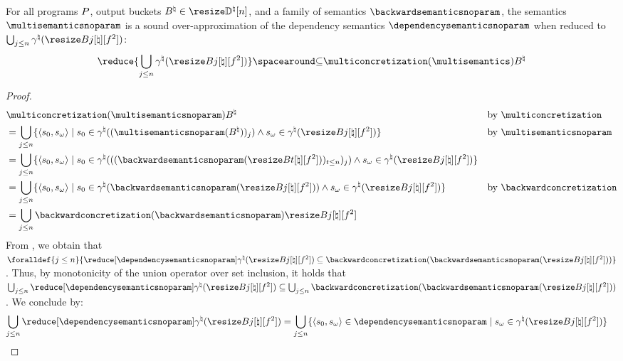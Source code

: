 \begin{lemma}
  For all programs $P$, output buckets $\buckets\in\vectorbuckets$, and a family of semantics $\backwardsemanticsnoparam$, the %
  semantics $\multisemanticsnoparam$ is a \textup{sound over-approximation} of the dependency semantics $\dependencysemanticsnoparam$ when reduced to $\bigsetjoin_{j\le n}\abstractdomainconcretization(\bucket)$:
  \[\reduce{\bigsetjoin_{j\le n}\abstractdomainconcretization(\bucket)} \SubseteQ \multiconcretization(\multisemantics)\buckets\]
\end{lemma}
\begin{proof}
  \begin{align*}
    &\vphantom{=} \multiconcretization(\multisemanticsnoparam)\buckets
      && \text{by $\multiconcretization$} \\
    &= \bigsetjoin_{j \le n}\setdef{\inputoutputtuple{\defstate}}{\retrieveinput{\defstate}\in\abstractdomainconcretization((\multisemanticsnoparam(\buckets))_j)\land\retrieveoutput{\defstate}\in\abstractdomainconcretization(\bucket)}
      && \text{by $\multisemanticsnoparam$} \\
    &= \bigsetjoin_{j \le n} \setdef{\inputoutputtuple{\defstate}}{\retrieveinput{\defstate}\in\abstractdomainconcretization(((\backwardsemanticsnoparam(\bucket[t]))_{t\le n})_j)\land\retrieveoutput{\defstate}\in\abstractdomainconcretization(\bucket)}
    && \\
    &= \bigsetjoin_{j \le n} \setdef{\inputoutputtuple{\defstate}}{\retrieveinput{\defstate}\in\abstractdomainconcretization(\backwardsemanticsnoparam(\bucket))\land\retrieveoutput{\defstate}\in\abstractdomainconcretization(\bucket)}
    && \text{by $\backwardconcretization$} \\
    &= \bigsetjoin_{j \le n} \backwardconcretization(\backwardsemanticsnoparam)\bucket
  \end{align*}
  From , we obtain that $\foralldef{j \le n}{\reduceddependencysemanticsnoparam \subseteq \backwardconcretization(\backwardsemanticsnoparam(\bucket))}$.
  Thus, by monotonicity of the union operator over set inclusion, it holds that $\bigsetjoin_{j\le n}\reduceddependencysemanticsnoparam \subseteq \bigsetjoin_{j\le n}\backwardconcretization(\backwardsemanticsnoparam(\bucket))$. We conclude by:
  \begin{align*}
    \bigsetjoin_{j\le n}\reduceddependencysemanticsnoparam &= \bigsetjoin_{j\le n} \setdef{\inputoutputtuple{\defstate}\in\dependencysemanticsnoparam}{\retrieveoutput{\defstate}\in\abstractdomainconcretization(\bucket)}

\end{align*}
\end{proof}

